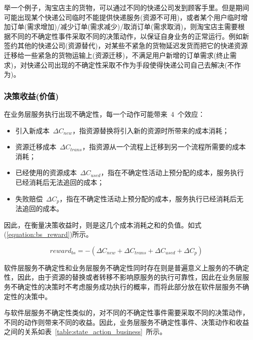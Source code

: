 举一个例子，淘宝店主的货物，可以通过不同的快递公司发到顾客手里。但是期间可能出现某个快递公司临时不能提供快递服务(资源不可用)，或者某个用户临时增加订单(需求增加)/减少订单(需求减少)/取消订单(需求取消)，则淘宝店主需要根据不同的不确定性事件采取不同的决策动作，以保证自身业务的正常运行。例如新签约其他的快递公司(资源替代)，对某些不紧急的货物延迟发货而把它的快递资源迁移给一些紧急的货物运输上(资源迁移)，不满足用户新增的订单需求(终止需求)，对快递公司出现的不确定性采取不作为手段使得快递公司自己去解决(不作为)。

\subsubsection{决策收益(价值)}

在业务层服务执行出现不确定性，每一个动作可能带来~4~个效应：

\begin{itemize}
    \item 引入新成本~$\Delta C_{new}$，指资源替换将引入新的资源时所带来的成本消耗；
    \item 资源迁移成本~$\Delta C_{trans}$，指资源从一个流程上迁移到另一个流程所需要的成本消耗；
    \item 已经使用的资源成本~$\Delta C_{used}$，指在不确定性活动上预分配的成本，服务执行已经消耗后无法追回的成本；
    \item 失败赔偿~$\Delta C_{p}$，指在不确定性活动上预分配的成本，服务执行已经消耗后无法追回的成本。
\end{itemize}

因此，在衡量决策收益时，则是这几个成本消耗之和的负值。如式(\ref{equation:bs_reward})所示。

\begin{equation}\label{equation:bs_reward}
reward_{bs} = - (\Delta C_{new} + \Delta C_{trans} + \Delta C_{used} + \Delta C_{p})
\end{equation}

软件层服务不确定性和业务层服务不确定性同时存在则是普遍意义上服务的不确定性，因此，由于资源的替换或者转移不影响原服务的执行可靠性，因此在业务层服务不确定性的决策时不考虑服务成功执行的概率，而将此部分放在软件层服务不确定性的决策中。

与软件层服务不确定性类似的，对不同的不确定性事件需要采取不同的决策动作，不同的动作则带来不同的收益。因此，业务层服务不确定性事件、决策动作和收益之间的关系如表~\ref{table:state_action_business}~所示。

